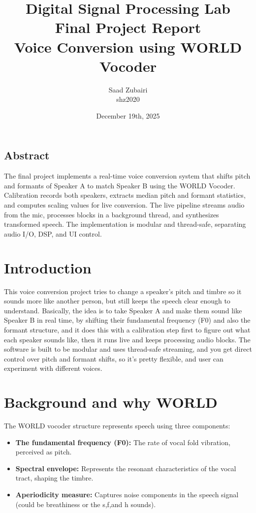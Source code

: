 \documentclass[11pt]{article}
\title{
    \vspace{3em}
    \textbf{Digital Signal Processing Lab}\\
    Final Project Report\\
    Voice Conversion using WORLD Vocoder\\
    \vspace{1em}
}
\author{
    Saad Zubairi \\ 
    shz2020 \\
    \vspace{1em}
}
\date{December 19th, 2025}
\begin{document}
\maketitle	

\pagebreak

\begin{center}
\begin{minipage}{0.85\textwidth}
\small
\section*{Abstract}
The final project implements a real-time voice conversion system that shifts pitch and formants of Speaker A to match Speaker B using the WORLD Vocoder. Calibration records both speakers, extracts median pitch and formant statistics, and computes scaling values for live conversion. The live pipeline streams audio from the mic, processes blocks in a background thread, and synthesizes transformed speech. The implementation is modular and thread-safe, separating audio I/O, DSP, and UI control.
\end{minipage}
\end{center}

\section{Introduction}
This voice conversion project tries to change a speaker's pitch and timbre so it sounds more like another person, but still keeps the speech clear enough to understand. Basically, the idea is to take Speaker A and make them sound like Speaker B in real time, by shifting their fundamental frequency (F0) and also the formant structure, and it does this with a calibration step first to figure out what each speaker sounds like, then it runs live and keeps processing audio blocks. The software is built to be modular and uses thread-safe streaming, and you get direct control over pitch and formant shifts, so it's pretty flexible, and user can experiment with different voices.

\section{Background and why WORLD}
The WORLD vocoder structure represents speech using three components:

\begin{itemize}
    \item \textbf{The fundamental frequency (F0):} The rate of vocal fold vibration, perceived as pitch.
    \item \textbf{Spectral envelope:} Represents the resonant characteristics of the vocal tract, shaping the timbre.
    \item \textbf{Aperiodicity measure:} Captures noise components in the speech signal (could be breathiness or the s,f,and h sounds).
\end{itemize}
  
\end{document}
